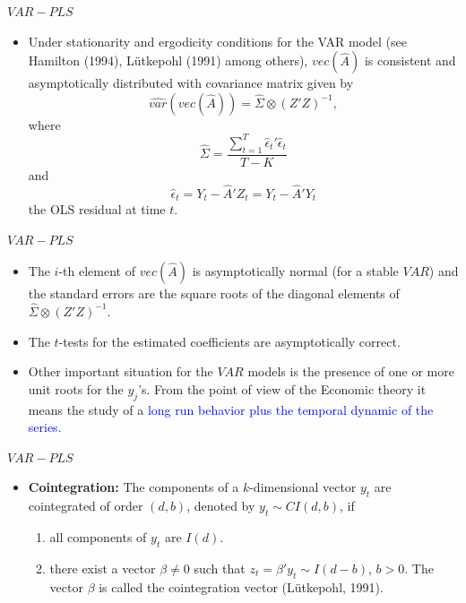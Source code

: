 \documentclass{beamer}
\newcommand{\?}{?`}
\begin{document}
\begin{frame}{$VAR-PLS$}
  \begin{itemize}
  \item     Under stationarity and ergodicity conditions  for the VAR model (see Hamilton (1994), L\"{u}tkepohl (1991) among others),
  $vec(\hat{A})$ is consistent and asymptotically distributed with covariance matrix given by
    \begin{displaymath}
      \widehat{var}\left(vec(\hat{A})\right)=\hat{\Sigma} \otimes
      (Z'Z)^{-1},
    \end{displaymath}
    where
    \begin{displaymath}
      \hat{\Sigma}=\frac{\sum_{t=1}^T\hat{\epsilon}_t'\hat{\epsilon}_t}{T-K}
    \end{displaymath}
    and
    \begin{displaymath}
      \hat{\epsilon}_t=Y_t-\hat{A}'Z_t=Y_t-\hat{A}'Y_t
    \end{displaymath}
    the OLS residual at time $t$.
  \end{itemize}
\end{frame}

\begin{frame}{$VAR-PLS$}
  \begin{itemize}
  \item The $i$-th element of $vec(\hat{A})$ is asymptotically normal (for a stable $VAR$)
  and the standard errors are the square roots of the diagonal elements of  $\hat{\Sigma}
    \otimes (Z'Z)^{-1}$.
    \item  The $t$-tests for the estimated coefficients are asymptotically correct.
    \item Other important situation for the $VAR$ models is the presence of one or more unit roots for the $y_j$'s.
    From the point of view of the Economic theory it means the study of a \textcolor{blue}{long run behavior plus the temporal dynamic of the series}.
      \end{itemize}
\end{frame}

\begin{frame}{$VAR-PLS$}
    \begin{itemize}
  \item \textbf{Cointegration: } The components of a $k$-dimensional vector  $y_t$ are cointegrated of order  $(d,b)$,
  denoted by  $y_t\sim CI(d,b)$,  if
  \bigskip
    \begin{enumerate}
    \item all components of $y_t$ are $I(d)$.
    \bigskip
    \item there exist a vector $\beta\neq 0$ such that  $z_t=\beta'y_t\sim
      I(d-b)$, $b>0$. The vector $\beta$ is called the cointegration vector
      (L\"{u}tkepohl, 1991).
          \end{enumerate}
  \end{itemize}
\end{frame}
\end{document}

